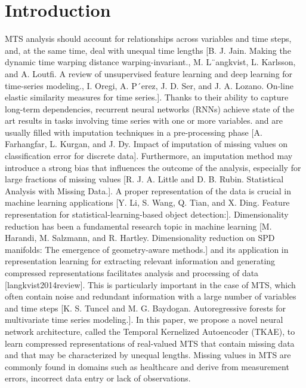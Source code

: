 \section{Introduction}
\iffalse
MTS analysis should account for relationships across variables and time steps, and, at the same time, deal with unequal time lengths [B. J. Jain. Making the dynamic time warping distance warping-invariant., M. L¨angkvist, L. Karlsson, and A. Loutﬁ. A review of unsupervised feature learning and deep learning for time-series modeling., I. Oregi, A. P´erez, J. D. Ser, and J. A. Lozano. On-line elastic similarity measures for time series.]. 
Thanks to their ability to capture long-term dependencies, recurrent neural networks (RNNs) achieve state of the art results in tasks involving time series with one or more variables.
and are usually ﬁlled with imputation techniques in a pre-processing phase [A. Farhangfar, L. Kurgan, and J. Dy. Impact of imputation of missing values on classiﬁcation error for discrete data]. Furthermore, an imputation method may introduce a strong bias that inﬂuences the outcome of the analysis, especially for large fractions of missing values [R. J. A. Little and D. B. Rubin. Statistical Analysis with Missing Data.].
A proper representation of the data is crucial in machine learning applications [Y. Li, S. Wang, Q. Tian, and X. Ding. Feature representation for statistical-learning-based object detection:].
Dimensionality reduction has been a fundamental research topic in machine learning [M. Harandi, M. Salzmann, and R. Hartley. Dimensionality reduction on SPD manifolds: The emergence of geometry-aware methods.] and its application in representation learning for extracting relevant information and generating compressed representations facilitates analysis and processing of data [langkvist2014review]. This is particularly important in the case of MTS, which often contain noise and redundant information with a large number of variables and time steps [K. S. Tuncel and M. G. Baydogan. Autoregressive forests for multivariate time series modeling.].
In this paper, we propose a novel neural network architecture, called the Temporal Kernelized Autoencoder (TKAE), to learn compressed representations of real-valued MTS that contain missing data and that may be characterized by unequal lengths.
Missing values in MTS are commonly found in domains such as healthcare and derive from measurement errors, incorrect data entry or lack of observations.

